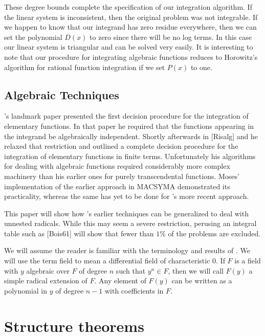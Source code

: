 These degree bounds complete the specification of our integration
algorithm.  If the linear system is inconsistent, then the original
problem was not integrable.  If we happen to know that our integrand
has zero residue everywhere, then we can set the polynomial $D(x)$ to zero
since there will be no log terms.
In this case our linear system is triangular and can be solved very easily.
It is interesting to note that our procedure for integrating algebraic
functions reduces to Horowitz's algorithm for rational function integration
if we set $P(x)$ to one.

\subsection{Algebraic Techniques}

{\Risch}'s landmark paper \cite{Risch:Integration:Solution} presented the
first decision 
procedure for the integration of elementary functions.  In that
paper he required that the functions appearing in the integrand be
algebraically independent.  Shortly afterwards in [Risalg]
and \cite{Risch:Integration:Solution} he relaxed
that restriction and outlined a complete decision procedure for
the integration of elementary functions in finite terms.
Unfortunately his algorithms for dealing with algebraic functions
required considerably more complex machinery than his earlier
ones for purely transcendental functions.  Moses' implementation
of the earlier approach in MACSYMA \cite{Macsyma:Manual} demonstrated its
practicality, whereas the same has yet to be done for {\Risch}'s 
more recent approach.

This paper will show how {\Risch}'s earlier techniques can be
generalized to deal with unnested radicals.  While this may seem
a severe restriction, perusing an integral table such as [Bois61]
will show that fewer than $1\%$ of the problems are excluded.

We will assume the reader is familiar with the terminology and results
of \cite{Risch:Integration:Solution}.  We will use the term field to
mean a differential field of characteristic 0.  If $F$ is a field with
$y$ algebraic over $F$ of degree $n$ such that $y^n \in F$, then we
will call $F(y)$ a simple radical extension of $F$.  Any element of
$F(y)$ can be written as a polynomial in $y$ of degree $n-1$ with
coefficients in $F$.

\section{Structure theorems}

